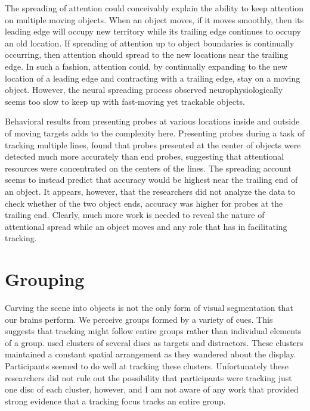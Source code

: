 \documentclass[
]{book}
\begin{document}
The spreading of attention could conceivably explain the ability to keep attention on multiple moving objects. When an object moves, if it moves smoothly, then its leading edge will occupy new territory while its trailing edge continues to occupy an old location. If spreading of attention up to object boundaries is continually occurring, then attention should spread to the new locations near the trailing edge. In such a fashion, attention could, by continually expanding to the new location of a leading edge and contracting with a trailing edge, stay on a moving object. However, the neural spreading process observed neurophysiologically seems too slow to keep up with fast-moving yet trackable objects.

Behavioral results from presenting probes at various locations inside and outside of moving targets adds to the complexity here. Presenting probes during a task of tracking multiple lines, \citet{alvarezHowDoesAttention2005} found that probes presented at the center of objects were detected much more accurately than end probes, suggesting that attentional resources were concentrated on the centers of the lines. The spreading account seems to instead predict that accuracy would be highest near the trailing end of an object. It appears, however, that the researchers did not analyze the data to check whether of the two object ends, accuracy was higher for probes at the trailing end. Clearly, much more work is needed to reveal the nature of attentional spread while an object moves and any role that has in facilitating tracking.

\hypertarget{grouping}{%
\chapter{Grouping}\label{grouping}}

Carving the scene into objects is not the only form of visual segmentation that our brains perform. We perceive groups formed by a variety of cues. This suggests that tracking might follow entire groups rather than individual elements of a group. \citet{alzahabiEnsemblePerceptionMultipleobject2021} used clusters of several discs as targets and distractors. These clusters maintained a constant spatial arrangement as they wandered about the display. Participants seemed to do well at tracking these clusters. Unfortunately these researchers did not rule out the possibility that participants were tracking just one disc of each cluster, however, and I am not aware of any work that provided strong evidence that a tracking focus tracks an entire group.
\end{document}
